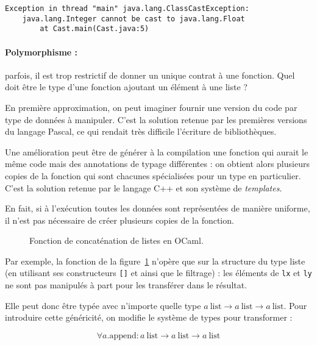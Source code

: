 \begin{Verbatim}
Exception in thread "main" java.lang.ClassCastException:
    java.lang.Integer cannot be cast to java.lang.Float
        at Cast.main(Cast.java:5)
\end{Verbatim}

\paragraph{Polymorphisme :} parfois, il est trop restrictif de donner un unique
contrat à une fonction. Quel doit être le type d'une fonction ajoutant un
élément à une liste ?

En première approximation, on peut imaginer fournir une version du code par type
de données à manipuler. C'est la solution retenue par les premières versions du
langage Pascal, ce qui rendait très difficile l'écriture de
bibliothèques\cite{PascalNoEscape}.

Une amélioration peut être de générer à la compilation une fonction qui aurait
le même code mais des annotations de typage différentes : on obtient alors
plusieurs copies de la fonction qui sont chacunes spécialisées pour un type en
particulier. C'est la solution retenue par le langage C++ et son système de
\emph{templates}.

En fait, si à l'exécution toutes les données sont représentées de manière
uniforme, il n'est pas nécessaire de créer plusieurs copies de la fonction.

\begin{figure}
  \caption{Fonction de concaténation de listes en OCaml.}
  \label{fig:listappend}
\end{figure}

Par exemple, la fonction de la figure~\ref{fig:listappend} n'opère que sur la
structure du type liste (en utilisant ses constructeurs \texttt{{[}{]}} et
\listcons ainsi que le filtrage) : les éléments de \texttt{lx} et \texttt{ly} ne
sont pas manipulés à part pour les transférer dans le résultat.


Elle peut donc être typée avec n'importe quelle type 
$a~\textrm{list} → a~\textrm{list} → a~\textrm{list}$. Pour introduire cette
généricité, on modifie le système de types pour transformer :

\[ ∀ a. \textrm{append} :
   a~\textrm{list} → a~\textrm{list} → a~\textrm{list}
\]

